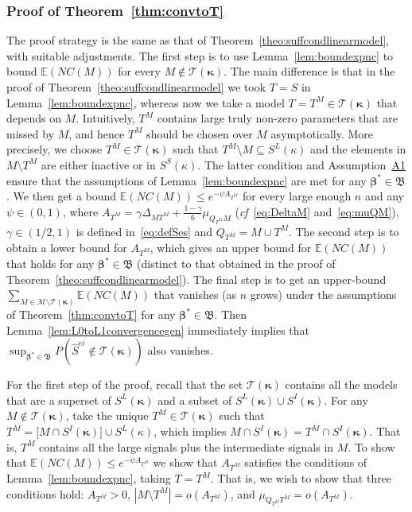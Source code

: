 \documentclass[
  12pt]{article}
\newcommand{\E}{\mathbb{E}}
\newcommand{\M}{\mathcal{M}}
\newcommand{\T}{\mathcal{T}}
\newcommand{\bbeta}{\boldsymbol{\beta}}
\newcommand{\bB}{\mathfrak{B}}
\newcommand{\bkappa}{\boldsymbol{\kappa}}
\begin{document}
\subsubsection{Proof of Theorem~\ref{thm:convtoT}}
The proof strategy is the same as that of Theorem~\ref{theo:suffcondlinearmodel}, with suitable adjustments. 
The first step is to use Lemma~\ref{lem:boundexpnc} to bound $\E(NC(M))$ for every $M\not\in \T(\bkappa)$. The main difference is that %
in the proof of Theorem~\ref{theo:suffcondlinearmodel} 
we took $T=S$ in Lemma~\ref{lem:boundexpnc}, whereas now we take  a model $T=T^M\in \T(\bkappa)$
that depends on $M$. 
Intuitively, $T^M$ contains large truly non-zero parameters that are missed by $M$, and hence $T^M$ should be chosen over $M$ asymptotically. More precisely,
we choose $T^M\in \T(\bkappa)$ such that %
$T^M\setminus M\subseteq S^L(\kappa)$ and the elements in $M\setminus T^M$ are either inactive or in $S^S(\kappa)$. The latter condition %
and Assumption~\hyperlink{lab:A1}{A1} ensure that the assumptions of Lemma~\ref{lem:boundexpnc} are met for any $\bbeta^*\in \bB$. We then get a bound $\E(NC(M)) \leq e^{-\psi A_{T^M}}$ for every large enough $n$ and any $\psi \in (0,1)$, where $A_{T^M}=\gamma\Delta_{MT^M}+\tfrac{1-\gamma}{6}\mu_{Q_{T^M}M}$ (\emph{cf}~\eqref{eq:DeltaM} and~\eqref{eq:muQM}), $\gamma\in(1/2,1)$ is defined in~\eqref{eq:defSes} and $Q_{T^M}= M\cup T^M$. The second step is to obtain a lower bound for $A_{T^M}$, which gives an upper bound for $\E(NC(M))$ that holds for any $\bbeta^*\in \bB$ (distinct to that obtained in the proof of Theorem~\ref{theo:suffcondlinearmodel}).
The final step is to %
get an upper-bound $\sum_{M \in \M\setminus \T(\bkappa)} \E\left(NC(M)\right)$ that vanishes (as $n$ grows) under the assumptions of Theorem~\ref{thm:convtoT} for any $\bbeta^*\in \bB$. Then Lemma~\ref{lem:L0toL1convergencegen} immediately implies that $\sup_{\bbeta^*\in \bB}P(\hat{S}^{ei}\not \in \T(\bkappa))$ also vanishes.

For the first step of the proof, recall that the set $\T(\bkappa)$ contains all the models that are a superset of $S^L(\bkappa)$ and a subset of $S^L(\bkappa)\cup S^{I}(\bkappa)$. For any $M \not\in\T(\bkappa)$, take the unique $T^M\in\T(\bkappa)$ such that $T^M = \big[M\cap S^{I}(\bkappa)\big]\cup S^L(\kappa) $, which implies $M\cap S^{I}(\bkappa)=T^M\cap S^{I}(\bkappa)$. 
That is, $T^M$ contains all the large signals plus the intermediate signals in $M$.
To show that $\E(NC(M)) \leq e^{-\psi A_{T^M}}$ we show that $A_{T^M}$ satisfies the conditions of Lemma~\ref{lem:boundexpnc}, taking $T=T^M$. That is, we wish to show that three conditions hold: $A_{T^M}>0$, $|M\setminus T^M|=o(A_{T^M})$, and $\mu_{Q_{T^M} T^M}=o(A_{T^M})$.
\end{document}
